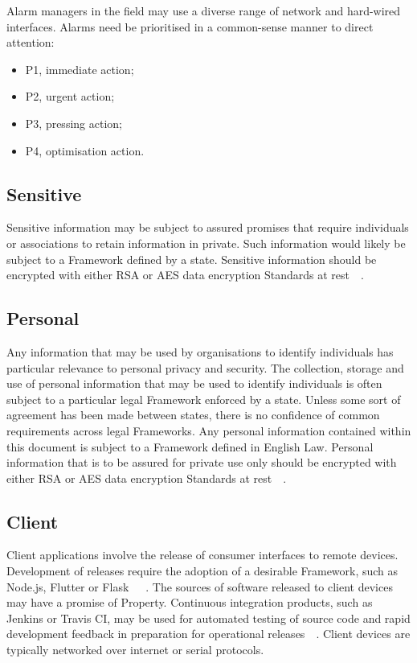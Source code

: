 \documentclass[11pt, oneside]{article}   	%
\begin{document}
Alarm managers in the field may use a diverse range of network and hard-wired interfaces.
Alarms need be prioritised in a common-sense manner to direct attention:

\begin{itemize}
	\item P1, immediate action; 
	\item P2, urgent action;
	\item P3, pressing action;
	\item P4, optimisation action.
\end{itemize}

\subsection{Sensitive}
Sensitive information may be subject to assured promises that require individuals or associations to retain information in private.
Such information would likely be subject to a Framework defined by a state.
Sensitive information should be encrypted with either RSA or AES data encryption Standards at rest~\cite{rsa}~\cite{aes}.

\subsection{Personal}
Any information that may be used by organisations to identify individuals has particular relevance to personal privacy and security.
The collection, storage and use of personal information that may be used to identify individuals is often subject to a particular legal Framework enforced by a state.
Unless some sort of agreement has been made between states, there is no confidence of common requirements across legal Frameworks.
Any personal information contained within this document is subject to a Framework defined in English Law.
Personal information that is to be assured for private use only should be encrypted with either RSA or AES data encryption Standards at rest~\cite{rsa}~\cite{aes}.

\subsection{Client}
Client applications involve the release of consumer interfaces to remote devices.
Development of releases require the adoption of a desirable Framework, such as Node.js, Flutter or Flask~\cite{node}~\cite{flutter}~\cite{flask}.
The sources of software released to client devices may have a promise of Property.
Continuous integration products, such as Jenkins or Travis CI, may be used for automated testing of source code and rapid development feedback in preparation for operational releases~\cite{jenkins}~\cite{travis}.
Client devices are typically networked over internet or serial protocols.\
\end{document}
